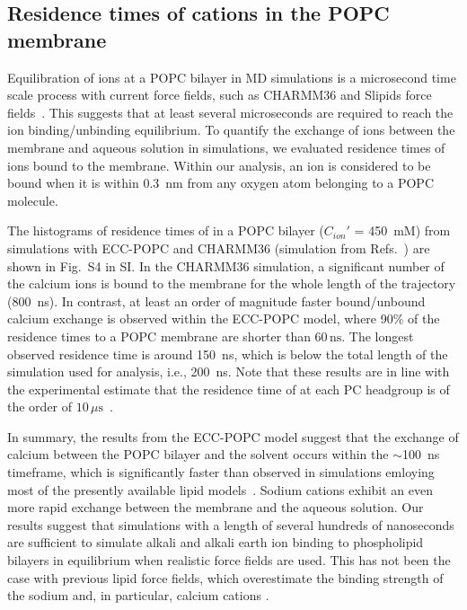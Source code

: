  
 
\subsection{Residence times of  cations in the POPC membrane} 
 
Equilibration of  ions at a POPC bilayer in MD simulations is a microsecond time scale process with current force fields, such  as CHARMM36 and Slipids force fields~\citep{javanainen17}. This suggests that at least several microseconds are required to reach the ion binding/unbinding equilibrium. 
To quantify the exchange of ions between the membrane and aqueous solution in simulations, we evaluated residence times of ions bound to the membrane. Within our analysis, an ion is considered to be bound when it is within 0.3~nm from any oxygen atom belonging to a POPC molecule. 
 
The histograms of residence times of  in a POPC bilayer ($C_{ion}'$ = 450~mM) from simulations with  
ECC-POPC and CHARMM36 (simulation from Refs.~\citep{javanainen17,zenodo.259376}) are shown in Fig.~S4 in SI. 
In the CHARMM36 simulation, a significant number of the calcium ions is bound to the membrane for the whole length of the trajectory (800~ns). 
In contrast, at least an order of magnitude faster bound/unbound calcium exchange is observed within the ECC-POPC model, 
where 90\% of the  residence times to a POPC membrane are shorter than $60\,\mathrm{ns}$. The longest observed 
residence time is around 150~ns, which is below the total length of the simulation used for analysis, i.e., 200~ns. 
Note that these results are in line with the experimental estimate that the residence time of  at each PC 
headgroup is of the order of $10\,\mu\mathrm{s}$~\citep{altenbach84}. 
 
In summary, the results from the ECC-POPC model suggest that the exchange of calcium between the POPC bilayer and the solvent occurs within the $\sim$100~ns timeframe, which is significantly faster than observed in simulations emloying most of the presently available lipid models~\citep{javanainen17}. Sodium cations exhibit an even more rapid exchange between the membrane and the aqueous solution. Our results suggest that simulations with a length of several hundreds of nanoseconds are sufficient to simulate alkali and alkali earth ion binding to phospholipid bilayers in equilibrium when realistic force fields are used. This has not been the case with previous lipid force fields, which overestimate the binding strength of the sodium and, in particular,  calcium cations \citep{javanainen17, catte16}. 
 
 









